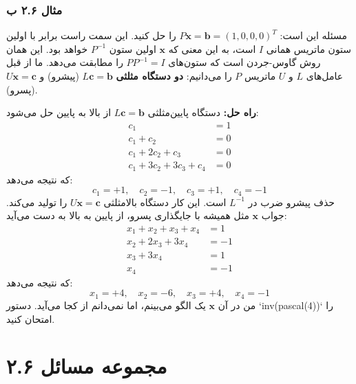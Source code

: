 \documentclass[12pt, a4paper]{book}
\begin{document}
	\subsubsection*{مثال ۲.۶ ب}
	مسئله این است: $P\mathbf{x}=\mathbf{b}=(1,0,0,0)^T$ را حل کنید. این سمت راست برابر با اولین ستون ماتریس همانی $I$ است، به این معنی که $\mathbf{x}$ اولین ستون $P^{-1}$ خواهد بود. این همان روش گاوس-جردن است که ستون‌های $PP^{-1}=I$ را مطابقت می‌دهد. ما از قبل عامل‌های $L$ و $U$ ماتریس $P$ را می‌دانیم:
	\textbf{دو دستگاه مثلثی} $L\mathbf{c}=\mathbf{b}$ (پیشرو) و $U\mathbf{x}=\mathbf{c}$ (پسرو).
	
	\textbf{راه حل:} دستگاه پایین‌مثلثی $L\mathbf{c}=\mathbf{b}$ از بالا به پایین حل می‌شود:
	\begin{align*}
		c_1 &= 1 \\
		c_1 + c_2 &= 0 \\
		c_1 + 2c_2 + c_3 &= 0 \\
		c_1 + 3c_2 + 3c_3 + c_4 &= 0
	\end{align*}
	که نتیجه می‌دهد:
	\[ c_1 = +1, \quad c_2 = -1, \quad c_3 = +1, \quad c_4 = -1 \]
	حذف پیشرو ضرب در $L^{-1}$ است. این کار دستگاه بالامثلثی $U\mathbf{x}=\mathbf{c}$ را تولید می‌کند. جواب $\mathbf{x}$ مثل همیشه با جایگذاری پسرو، از پایین به بالا به دست می‌آید:
	\begin{align*}
		x_1 + x_2 + x_3 + x_4 &= 1 \\
		x_2 + 2x_3 + 3x_4 &= -1 \\
		x_3 + 3x_4 &= 1 \\
		x_4 &= -1
	\end{align*}
	که نتیجه می‌دهد:
	\[ x_1 = +4, \quad x_2 = -6, \quad x_3 = +4, \quad x_4 = -1 \]
	من در آن $\mathbf{x}$ یک الگو می‌بینم، اما نمی‌دانم از کجا می‌آید. دستور `inv(pascal(4))` را امتحان کنید.
	
	\newpage
	\section*{مجموعه مسائل ۲.۶}
	
\end{document}
